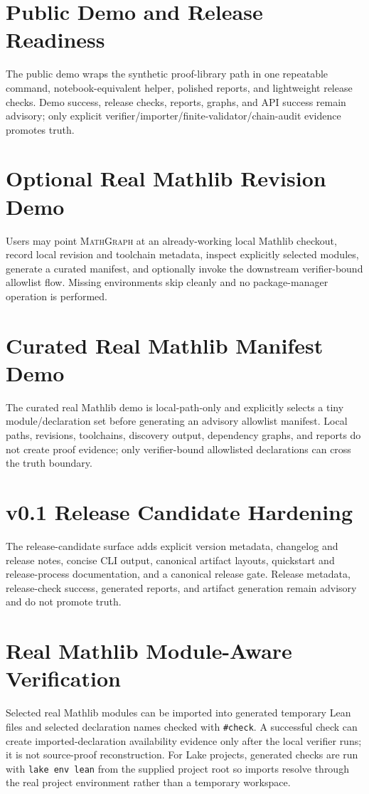 \documentclass[11pt,a4paper]{article}
\newcommand{\MG}{\textsc{MathGraph}}
\begin{document}
\section{Public Demo and Release Readiness}
The public demo wraps the synthetic proof-library path in one repeatable command,
notebook-equivalent helper, polished reports, and lightweight release checks.
Demo success, release checks, reports, graphs, and API success remain advisory;
only explicit verifier/importer/finite-validator/chain-audit evidence promotes truth.

\section{Optional Real Mathlib Revision Demo}
Users may point \MG{} at an already-working local Mathlib checkout, record local
revision and toolchain metadata, inspect explicitly selected modules, generate a
curated manifest, and optionally invoke the downstream verifier-bound allowlist
flow. Missing environments skip cleanly and no package-manager operation is
performed.

\section{Curated Real Mathlib Manifest Demo}
The curated real Mathlib demo is local-path-only and explicitly selects a tiny
module/declaration set before generating an advisory allowlist manifest. Local
paths, revisions, toolchains, discovery output, dependency graphs, and reports
do not create proof evidence; only verifier-bound allowlisted declarations can
cross the truth boundary.

\section{v0.1 Release Candidate Hardening}
The release-candidate surface adds explicit version metadata, changelog and
release notes, concise CLI output, canonical artifact layouts, quickstart and
release-process documentation, and a canonical release gate. Release metadata,
release-check success, generated reports, and artifact generation remain
advisory and do not promote truth.

\section{Real Mathlib Module-Aware Verification}
Selected real Mathlib modules can be imported into generated temporary Lean
files and selected declaration names checked with \texttt{\#check}. A successful
check can create imported-declaration availability evidence only after the local
verifier runs; it is not source-proof reconstruction.
For Lake projects, generated checks are run with \texttt{lake env lean} from the
supplied project root so imports resolve through the real project environment
rather than a temporary workspace.
\end{document}
